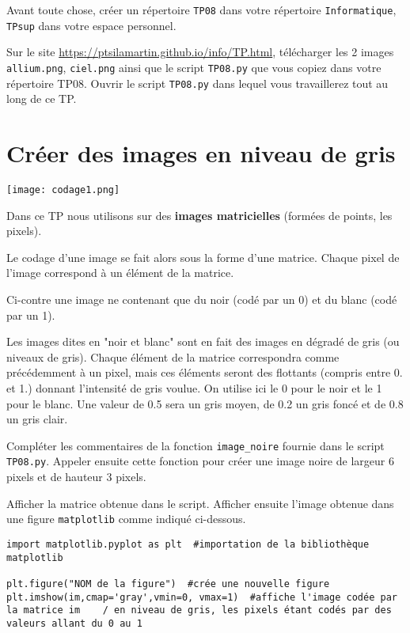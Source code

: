 Avant toute chose, créer un répertoire \texttt{TP08} dans votre répertoire \texttt{Informatique}, \texttt{TPsup} dans votre espace personnel.

Sur le site \url{https://ptsilamartin.github.io/info/TP.html}, télécharger les 2  images \texttt{allium.png}, \texttt{ciel.png} ainsi que le script \texttt{TP08.py} que vous copiez dans votre répertoire TP08. Ouvrir le script \texttt{TP08.py} dans lequel vous travaillerez tout au long de ce TP.

\section*{Créer des images en niveau de gris}



\begin{marginfigure}
\texttt{[image: codage1.png]}
\end{marginfigure}
Dans ce TP nous utilisons sur des \textbf{images matricielles} (formées de points, les pixels). 

Le codage d'une image se fait alors sous la forme d'une matrice. Chaque pixel de l'image correspond à un élément de la matrice.

Ci-contre une image ne contenant que du noir (codé par un 0) et du blanc (codé par un 1).


Les images dites en "noir et blanc" sont en fait des images en dégradé de gris (ou niveaux de gris). Chaque élément de la matrice correspondra comme précédemment à un pixel, mais ces éléments seront des flottants (compris entre 0. et 1.) donnant l'intensité de gris voulue. On utilise ici le 0 pour le noir et le 1 pour le blanc. Une valeur de 0.5 sera un gris moyen, de 0.2 un gris foncé et de 0.8 un gris clair.

\begin{question}
Compléter les commentaires de la fonction \texttt{image\_noire} fournie dans le script \texttt{TP08.py}. Appeler ensuite cette fonction pour créer une image noire de largeur 6 pixels et de hauteur 3 pixels.
\end{question}

\begin{question}
Afficher la matrice obtenue dans le script. Afficher ensuite  l'image obtenue dans une figure \texttt{matplotlib} comme indiqué ci-dessous.
\end{question}

\begin{lstlisting}
import matplotlib.pyplot as plt  #importation de la bibliothèque matplotlib

plt.figure("NOM de la figure")  #crée une nouvelle figure
plt.imshow(im,cmap='gray',vmin=0, vmax=1)  #affiche l'image codée par la matrice im    / en niveau de gris, les pixels étant codés par des valeurs allant du 0 au 1 
\end{lstlisting}



